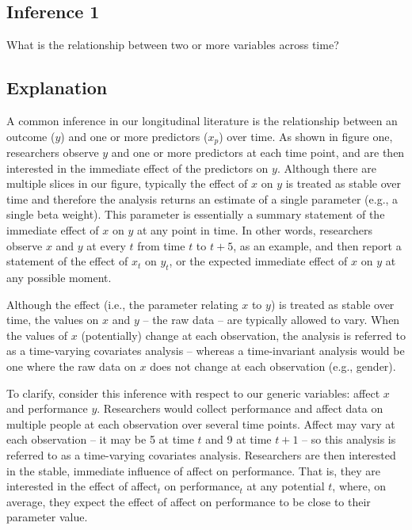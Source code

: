 \documentclass[english,,man]{apa6}
\theoremstyle{definition}
\theoremstyle{definition}
\theoremstyle{definition}
\theoremstyle{remark}
\begin{document}
\hypertarget{inference-1}{%
\subsection{Inference 1}\label{inference-1}}

What is the relationship between two or more variables across time?

\hypertarget{explanation}{%
\subsection{Explanation}\label{explanation}}

A common inference in our longitudinal literature is the relationship
between an outcome (\(y\)) and one or more predictors (\(x_{p}\)) over
time. As shown in figure one, researchers observe \(y\) and one or more
predictors at each time point, and are then interested in the immediate
effect of the predictors on \(y\). Although there are multiple slices in
our figure, typically the effect of \(x\) on \(y\) is treated as stable
over time and therefore the analysis returns an estimate of a single
parameter (e.g., a single beta weight). This parameter is essentially a
summary statement of the immediate effect of \(x\) on \(y\) at any point
in time. In other words, researchers observe \(x\) and \(y\) at every
\(t\) from time \(t\) to \(t + 5\), as an example, and then report a
statement of the effect of \(x_{t}\) on \(y_{t}\), or the expected
immediate effect of \(x\) on \(y\) at any possible moment.

Although the effect (i.e., the parameter relating \(x\) to \(y\)) is
treated as stable over time, the values on \(x\) and \(y\) -- the raw
data -- are typically allowed to vary. When the values of \(x\)
(potentially) change at each observation, the analysis is referred to as
a time-varying covariates analysis -- whereas a time-invariant analysis
would be one where the raw data on \(x\) does not change at each
observation (e.g., gender).

To clarify, consider this inference with respect to our generic
variables: affect \(x\) and performance \(y\). Researchers would collect
performance and affect data on multiple people at each observation over
several time points. Affect may vary at each observation -- it may be 5
at time \(t\) and 9 at time \(t + 1\) -- so this analysis is referred to
as a time-varying covariates analysis. Researchers are then interested
in the stable, immediate influence of affect on performance. That is,
they are interested in the effect of affect\(_{t}\) on
performance\(_{t}\) at any potential \(t\), where, on average, they
expect the effect of affect on performance to be close to their
parameter value.
\end{document}
